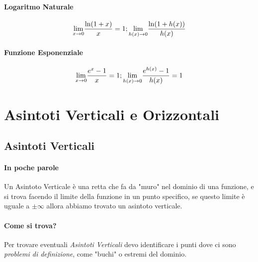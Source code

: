\paragraph*{Logaritmo Naturale}
$$\underset{x \to 0}{\lim} \frac{\ln(1+x)}{x} = 1 ; \underset{h(x) \to 0}{\lim} \frac{\ln(1+h(x))}{h(x)}$$ 

\paragraph*{Funzione Esponenziale}
$$\underset{x \to 0}{\lim} \frac{e^x-1}{x} = 1; \underset{h(x) \to 0}{\lim} \frac{e^{h(x)}-1}{h(x)} = 1$$


\section{Asintoti Verticali e Orizzontali}
\subsection*{Asintoti Verticali}
\paragraph*{In poche parole} Un Asintoto Verticale è una retta che fa da "muro" nel dominio di una funzione, e si trova facendo il limite della funzione in un punto specifico, se questo limite è uguale a $\pm \infty$ allora abbiamo trovato un asintoto verticale.

\paragraph*{Come si trova?} Per trovare eventuali \emph{Asintoti Verticali} devo identificare i punti dove ci sono \emph{problemi di definizione},
come "buchi" o estremi del dominio.


